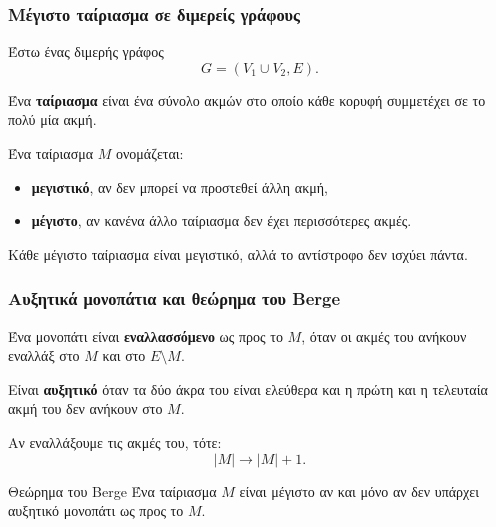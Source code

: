 \documentclass{beamer}
\begin{document}
	
	\begin{frame}
		\frametitle{Μέγιστο ταίριασμα σε διμερείς γράφους}
		
		Έστω ένας διμερής γράφος
		\[
		G=(V_1\cup V_2,E).
		\]
		
		Ένα \textbf{ταίριασμα} είναι ένα σύνολο ακμών στο οποίο κάθε κορυφή συμμετέχει σε το πολύ μία ακμή.
		
		\vspace{0.2cm}
		
		Ένα ταίριασμα $M$ ονομάζεται:
		
		\begin{itemize}
			\item \textbf{μεγιστικό}, αν δεν μπορεί να προστεθεί άλλη ακμή,
			\item \textbf{μέγιστο}, αν κανένα άλλο ταίριασμα δεν έχει περισσότερες ακμές.
		\end{itemize}
		
		Κάθε μέγιστο ταίριασμα είναι μεγιστικό, αλλά το αντίστροφο δεν ισχύει πάντα.
	\end{frame}
	
	\begin{frame}
		\frametitle{Αυξητικά μονοπάτια και θεώρημα του Berge}
		
		Ένα μονοπάτι είναι \textbf{εναλλασσόμενο} ως προς το $M$, όταν οι ακμές του ανήκουν εναλλάξ στο $M$ και στο $E\setminus M$.
		
		\vspace{0.2cm}
		
		Είναι \textbf{αυξητικό} όταν τα δύο άκρα του είναι ελεύθερα και η πρώτη και η τελευταία ακμή του δεν ανήκουν στο $M$.
		
		Αν εναλλάξουμε τις ακμές του, τότε:
		\[
		|M|\longrightarrow |M|+1.
		\]
		
		\begin{block}{Θεώρημα του Berge}
			Ένα ταίριασμα $M$ είναι μέγιστο αν και μόνο αν δεν υπάρχει αυξητικό μονοπάτι ως προς το $M$.
		\end{block}
	\end{frame}
	
\end{document}
